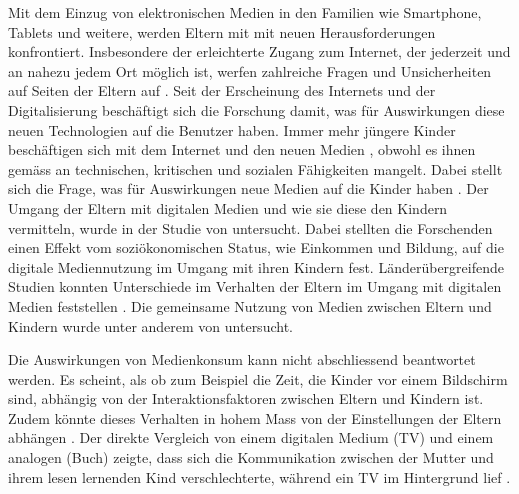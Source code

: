 Mit dem Einzug von elektronischen Medien in den Familien wie Smartphone, Tablets und weitere, werden Eltern mit mit neuen Herausforderungen konfrontiert. Insbesondere der erleichterte Zugang zum Internet, der jederzeit und an nahezu jedem Ort möglich ist, werfen zahlreiche Fragen und Unsicherheiten auf Seiten der Eltern auf \cite{Wagner2016}. Seit der Erscheinung des Internets und der Digitalisierung beschäftigt sich die Forschung damit, was für Auswirkungen diese neuen Technologien auf die Benutzer haben. Immer mehr jüngere Kinder beschäftigen sich mit dem Internet und den neuen Medien \cite{Rideout2013a, Chaudron2015}, obwohl es ihnen gemäss  an technischen, kritischen und sozialen Fähigkeiten mangelt. Dabei stellt sich die Frage, was für Auswirkungen neue Medien auf die Kinder haben \cite{Tomopoulos2010, Pempek2014, Livingstone2015, Masur2015, Troseth2016}. Der Umgang der Eltern mit digitalen Medien und wie sie diese den Kindern vermitteln, wurde in der Studie von  untersucht. Dabei stellten die Forschenden einen Effekt vom soziökonomischen Status, wie Einkommen und Bildung, auf die digitale Mediennutzung im Umgang mit ihren Kindern fest. Länderübergreifende Studien konnten Unterschiede im Verhalten der Eltern im Umgang mit digitalen Medien feststellen \cite{Helsper2013}. Die gemeinsame Nutzung von Medien zwischen Eltern und Kindern wurde unter anderem von  untersucht. 

Die Auswirkungen von Medienkonsum kann nicht abschliessend beantwortet werden. Es scheint, als ob zum Beispiel die Zeit, die Kinder vor einem Bildschirm sind, abhängig von der Interaktionsfaktoren zwischen Eltern und Kindern ist. Zudem könnte dieses Verhalten in hohem Mass von der Einstellungen der Eltern abhängen \cite{Lauricella2015}. Der direkte Vergleich von einem digitalen Medium (TV) und einem analogen (Buch) zeigte, dass sich die Kommunikation zwischen der Mutter und ihrem lesen lernenden Kind verschlechterte, während ein TV im Hintergrund lief \cite{Nathanson2011}.

